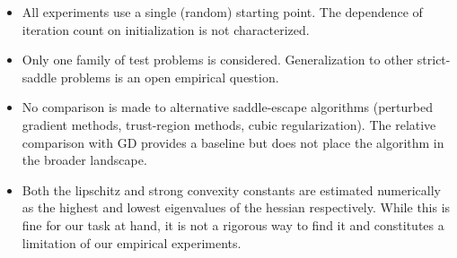 \documentclass[11pt,a4paper]{article}
\theoremstyle{plain}
\theoremstyle{definition}
\begin{document}
\begin{itemize}[leftmargin=2em]
  \item All experiments use a single (random) starting point. The dependence of iteration count on initialization is not characterized.
  \item Only one family of test problems is considered. Generalization to other strict-saddle problems is an open empirical question.
  \item No comparison is made to alternative saddle-escape algorithms (perturbed gradient methods, trust-region methods, cubic regularization). The relative comparison with GD provides a baseline but does not place the algorithm in the broader landscape.
  \item Both the lipschitz and strong convexity constants are estimated numerically as the highest and lowest eigenvalues of the hessian respectively. While this is fine for our task at hand, it is not a rigorous way to find it and constitutes a limitation of our empirical experiments.
\end{itemize}



\end{document}
